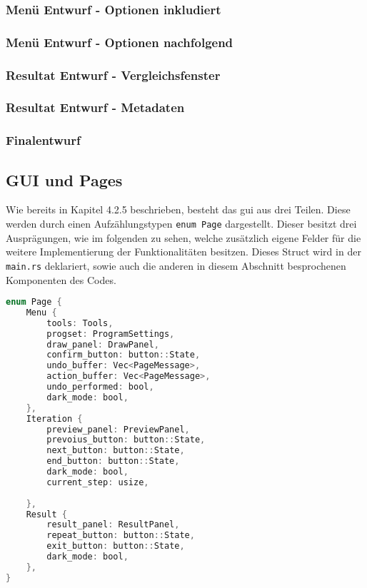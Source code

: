 \subsubsection{Menü Entwurf - Optionen inkludiert}
\subsubsection{Menü Entwurf - Optionen nachfolgend}
\subsubsection{Resultat Entwurf - Vergleichsfenster}
\subsubsection{Resultat Entwurf - Metadaten}
\subsubsection{Finalentwurf}


\subsection{GUI und Pages}
Wie bereits in Kapitel 4.2.5 beschrieben, besteht das \ac{gui} aus drei Teilen. Diese werden durch einen Aufzählungstypen \lstinline{enum Page} dargestellt. Dieser besitzt drei Ausprägungen, wie im folgenden zu sehen, welche zusätzlich eigene Felder für die weitere 
Implementierung der Funktionalitäten besitzen. Dieses Struct wird in der \lstinline{main.rs} deklariert, sowie auch die anderen in diesem Abschnitt besprochenen Komponenten des Codes.

\begin{lstlisting}[language=C]
enum Page {
    Menu { 
        tools: Tools,
        progset: ProgramSettings,
        draw_panel: DrawPanel,
        confirm_button: button::State,
        undo_buffer: Vec<PageMessage>,
        action_buffer: Vec<PageMessage>,
        undo_performed: bool,
        dark_mode: bool,
    },
    Iteration {
        preview_panel: PreviewPanel,
        prevoius_button: button::State,
        next_button: button::State,
        end_button: button::State,
        dark_mode: bool,
        current_step: usize,
        
    },
    Result {
        result_panel: ResultPanel,
        repeat_button: button::State,
        exit_button: button::State,
        dark_mode: bool,
    },
}    
\end{lstlisting}

